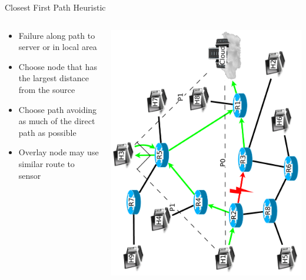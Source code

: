\documentclass[pdftex]{beamer}
\begin{document}

\begin{frame}{Closest First Path Heuristic}
\begin{columns}
\begin{column}{.5\textwidth}
\begin{itemize}
	\item Failure along path to server or in local area
	\item Choose node that has the largest distance from the source
	\item Choose path avoiding as much of the direct path as possible
	\item Overlay node may use similar route to sensor
\end{itemize}
\end{column}
	
\begin{column}{.5\textwidth}
\includegraphics[height=\textwidth,angle=-90]{angular_path}
\end{column}

\end{columns}
\end{frame}

\end{document}
